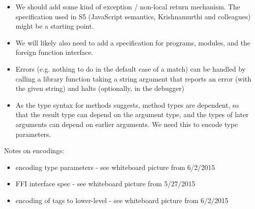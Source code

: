 \documentclass{article}
\newcommand{\keywadj}[1]{\mathtt{#1}}
\newcommand{\keyw}[1]{\keywadj{#1}~}
\begin{document}
\begin{itemize}


\item We should add some kind of exception / non-local return mechanism.  The specification used in S5 (JavaScript semantics, Krishnamurthi and colleagues) might be a starting point.

\item We will likely also need to add a specification for programs, modules, and the foreign function interface.

\item Errors (e.g. nothing to do in the default case of a match) can be handled by calling a library function taking a string argument that reports an error (with the given string) and halts (optionally, in the debugger)


\item As the type syntax for methods suggests, method types are dependent, so that the result type can depend on the argument type, and the types of later arguments can depend on earlier arguments.  We need this to encode type parameters.  %

\end{itemize}

Notes on encodings:

\begin{itemize}

\item encoding type parameters - see whiteboard picture from 6/2/2015

\item FFI interface spec - see whiteboard picture from 5/27/2015

\item encoding of tags to lower-level - see whiteboard picture from 6/2/2015

\end{itemize}
\end{document}
